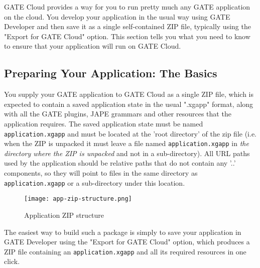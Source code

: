 
GATE Cloud provides a way for you to run pretty much any GATE application on
the cloud.  You develop your application in the usual way using GATE Developer
and then save it as a single self-contained ZIP file, typically using the
"Export for GATE Cloud" option.  This section tells you
what you need to know to ensure that your application will run on
GATE Cloud.

\subsection{Preparing Your Application: The Basics}

You supply your GATE application to GATE Cloud as a single ZIP file, which
is expected to contain a saved application state in the usual ".xgapp" format,
along with all the GATE plugins, JAPE grammars and other resources that the
application requires.  The saved application state must be named
{\tt application.xgapp} and must be located at the 'root directory' of the zip file
(i.e. when the ZIP is unpacked it must leave a file named {\tt application.xgapp}
in \emph{the directory where the ZIP is unpacked} and not in a sub-directory).
All URL paths used by the application should be relative paths that do not
contain any '..' components, so they will point to files in the same directory
as {\tt application.xgapp} or a sub-directory under this location.

\begin{figure}[htbp]
\begin{center}
\texttt{[image: app-zip-structure.png]}
\end{center}
\caption{Application ZIP structure}
\label{fig:cloudappzipstructure}
\end{figure}

The easiest way to build such a package is simply to save your application in
GATE Developer using the "Export for GATE Cloud" option, which produces a ZIP
file containing an {\tt application.xgapp} and all its required resources in one
click.


